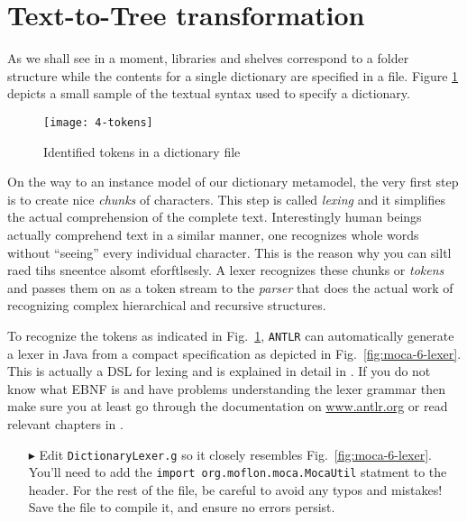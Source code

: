 \newpage
\section{Text-to-Tree transformation}
\genHeader

As we shall see in a moment, libraries and shelves correspond to a folder structure while the contents for a single dictionary are specified in a file.
Figure \ref{fig:moca-4-Tokens} depicts a small sample of the textual syntax used to specify a dictionary. 

\begin{figure}[!htbp]
\begin{center}
 \texttt{[image: 4-tokens]}
  \caption{Identified tokens in a dictionary file \update}
  \label{fig:moca-4-Tokens}
\end{center}
\end{figure}

On the way to an instance model of our dictionary metamodel, the very first step is to create nice \emph{chunks} of characters. This step is called
\emph{lexing} and it simplifies the actual comprehension of the complete text. Interestingly human beings actually comprehend text in a similar manner, one
recognizes whole words without ``seeing'' every individual character. This is the reason why you can siltl raed tihs sneentce alsomt eforftlsesly. A lexer
recognizes these chunks or \emph{tokens} and passes them on as a token stream to the \emph{parser} that does the actual work of recognizing complex
hierarchical and recursive structures.
   
To recognize the tokens as indicated in Fig.~\ref{fig:moca-4-Tokens}, \texttt{ANTLR} can automatically generate a lexer in Java from a compact specification as
depicted in Fig.~\ref{fig:moca-6-lexer}. This is actually a DSL for lexing and is explained in detail in \cite{ANTLR}. If you do not know what EBNF is and have
problems understanding the lexer grammar then make sure you at least go through the documentation on \url{www.antlr.org} or read relevant chapters in
\cite{ANTLR}.

\begin{itemize}
  
\item[$\blacktriangleright$] Edit \texttt{DictionaryLexer.g} so it closely resembles Fig.~\ref{fig:moca-6-lexer}. You'll need to add the \texttt{import
org.moflon.moca.MocaUtil} statment to the header. For the rest of the file, be careful to avoid any typos and mistakes! Save the file to compile it, and ensure
no errors persist.

\end{itemize}
\newpage

